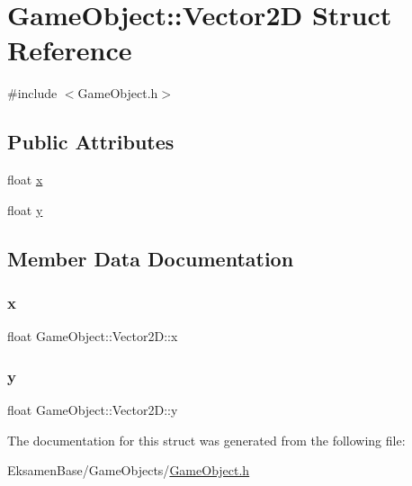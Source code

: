 \hypertarget{struct_game_object_1_1_vector2_d}{}\section{Game\+Object\+:\+:Vector2D Struct Reference}
\label{struct_game_object_1_1_vector2_d}


{\ttfamily \#include $<$Game\+Object.\+h$>$}

\subsection*{Public Attributes}
\begin{DoxyCompactItemize}
\item 
float \mbox{\hyperlink{struct_game_object_1_1_vector2_d_a93df427a93ef879133dba16d5b1a263e}{x}}
\item 
float \mbox{\hyperlink{struct_game_object_1_1_vector2_d_aab28c50090944680c16a79d404e2d485}{y}}
\end{DoxyCompactItemize}


\subsection{Member Data Documentation}
\mbox{\label{struct_game_object_1_1_vector2_d_a93df427a93ef879133dba16d5b1a263e}} 
\subsubsection{\texorpdfstring{x}{x}}
{\footnotesize\ttfamily float Game\+Object\+::\+Vector2\+D\+::x}

\mbox{\label{struct_game_object_1_1_vector2_d_aab28c50090944680c16a79d404e2d485}} 
\subsubsection{\texorpdfstring{y}{y}}
{\footnotesize\ttfamily float Game\+Object\+::\+Vector2\+D\+::y}



The documentation for this struct was generated from the following file\+:\begin{DoxyCompactItemize}
\item 
Eksamen\+Base/\+Game\+Objects/\mbox{\hyperlink{_game_object_8h}{Game\+Object.\+h}}\end{DoxyCompactItemize}
